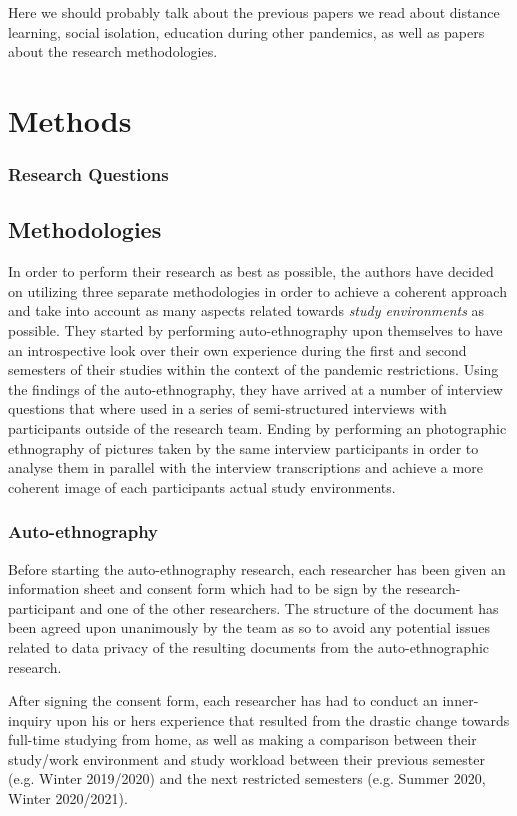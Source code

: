 \documentclass{sigchi}
\begin{document}
Here we should probably talk about the previous papers we read about distance learning, social isolation, education during other pandemics, as well as papers about the research methodologies.

\section{Methods}

\subsubsection{Research Questions}


\subsection{Methodologies}
In order to perform their research as best as possible, the authors have decided on utilizing three separate methodologies in order to achieve a coherent approach and take into account as many aspects related towards \emph{study environments} as possible. They started by performing auto-ethnography upon themselves to have an introspective look over their own experience during the first and second semesters of their studies within the context of the pandemic restrictions. Using the findings of the auto-ethnography, they have arrived at a number of interview questions that where used in a series of semi-structured interviews with participants outside of the research team. Ending by performing an photographic ethnography of pictures taken by the same interview participants in order to analyse them in parallel with the interview transcriptions and achieve a more coherent image of each participants actual study environments.

\subsubsection{Auto-ethnography}

Before starting the auto-ethnography research, each researcher has been given an information sheet and consent form which had to be sign by the research-participant and one of the other researchers. The structure of the document has been agreed upon unanimously by the team as so to avoid any potential issues related to data privacy of the resulting documents from the auto-ethnographic research.

After signing the consent form, each researcher has had to conduct an inner-inquiry upon his or hers experience that resulted from the drastic change towards full-time studying from home, as well as making a comparison between their study/work environment and study workload between their previous semester (e.g. Winter 2019/2020) and the next restricted semesters (e.g. Summer 2020, Winter 2020/2021).
\end{document}
